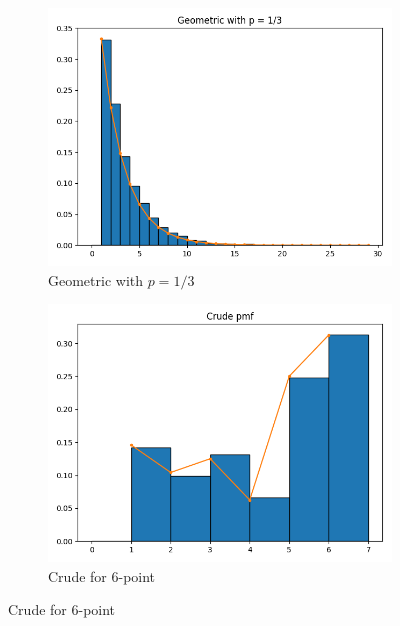\begin{figure}[H]
        \centering
        \begin{subfigure}[H]{0.475\textwidth}
            \centering
            \includegraphics[width=\textwidth]{geo.png}
            \caption[Network2]%
            {{\small Geometric with $p=1/3$}}    
            \label{fig:mean and std of net14}
        \end{subfigure}
        \hfill
        \begin{subfigure}[H]{0.475\textwidth}  
            \centering 
            \includegraphics[width=\textwidth]{crude.png}
            \caption[]%
            {{\small Crude for 6-point}}    
            \label{fig:mean and std of net24}
        \end{subfigure}

\end{figure}
